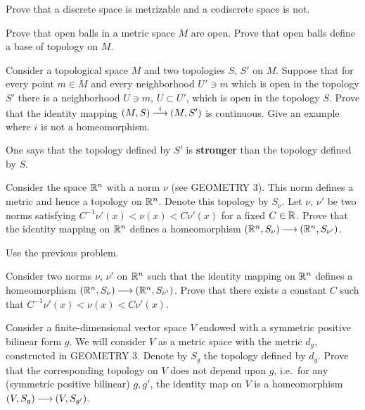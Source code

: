 \documentclass[12pt]{article}
\begin{document}
\begin{zadacha} 
Prove that a discrete space is metrizable and a codiscrete space is
not.
\end{zadacha}

\begin{zadacha} 
Prove that open balls in a metric space $M$ are open.  Prove that
open balls define a base of topology on $M$.
\end{zadacha}

\begin{zadacha}[!]
  Consider a topological space $M$ and two topologies $S$, $S'$ on
  $M$.  Suppose that for every point $m\in M$ and every neighborhood
  $U'\ni m$ which is open in the topology $S'$ there is a neighborhood
  $U\ni m$, $U\subset U'$, which is open in the topology $S$. Prove
  that the identity mapping $(M, S) \overset{i}{{\:\longrightarrow\:}} (M, S')$
  is continuous. Give an example where $i$ is not a homeomorphism.
\end{zadacha}

\begin{zamechanie}
 One says that the topology defined by $S'$ is {\bf  stronger} 
than the topology defined by $S$.
\end{zamechanie}

\begin{zadacha}  
Consider the space ${\mathbb R}^n$ with a norm $\nu$ (see GEOMETRY 3). This norm
defines a metric and hence a topology on ${\mathbb R}^n$. Denote this topology
by $S_\nu$. Let $\nu$, $\nu'$ be two norms satisfying
$C^{-1} \nu'(x) <\nu(x)< C\nu'(x)$ for a fixed $C\in {\mathbb R}$. 
Prove that the identity mapping on ${\mathbb R}^n$ defines a
homeomorphism $({\mathbb R}^n, S_\nu){\:\longrightarrow\:} ({\mathbb R}^n, S_{\nu'})$. 
\end{zadacha}

\begin{ukazanie}
Use the previous problem.
\end{ukazanie}

\begin{zadacha}[*]
Consider two norms $\nu$, $\nu'$ on ${\mathbb R}^n$ such that the identity
mapping on ${\mathbb R}^n$ defines a homeomorphism $({\mathbb R}^n, S_\nu){\:\longrightarrow\:} ({\mathbb R}^n,
S_{\nu'})$. Prove that there exists a constant $C$ such that $C^{-1}
\nu'(x) <\nu(x)< C \nu'(x)$. 
\end{zadacha}

\begin{zadacha}[*]
  Consider a finite-dimensional vector space $V$ endowed with a
  symmetric positive bilinear form $g$. We will consider $V$ as a metric space
  with the metric $d_g$, constructed in GEOMETRY 3. Denote by $S_g$ 
the topology
  defined by $d_g$. Prove that the corresponding topology on $V$ does
  not depend upon $g$, i.e.\ for any 
(symmetric positive bilinear)  $g, g'$, the identity map on
  $V$ is a homeomorphism $(V, S_g){\:\longrightarrow\:} (V, S_{g'})$.
\end{zadacha}
\end{document}
